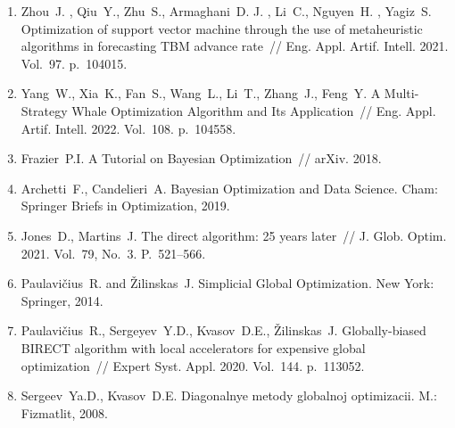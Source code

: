 \documentclass[a4paper,12pt,russian]{article}
\begin{document}
\begin{enumerate}
\item \label{rfa:enlit:Zhou2021}
Zhou~J. , Qiu~Y.,  Zhu~S., Armaghani~D. J. , Li~C., Nguyen~H. , Yagiz~S. Optimization of support vector machine through the use of metaheuristic algorithms in forecasting {TBM} advance rate~// Eng. Appl. Artif. Intell. 2021. Vol.~97. p.~104015.  %

\item \label{rfa:enlit:Yang2022}
Yang~W., Xia~K., Fan~S., Wang~L., Li~T., Zhang~J., Feng~Y. A Multi-Strategy Whale Optimization Algorithm and Its Application~// Eng. Appl. Artif. Intell. 2022. Vol.~108. p.~104558. %

\item \label{rfa:enlit:Frazier2018}
Frazier~P.I. A Tutorial on Bayesian Optimization~// arXiv. 2018. %

\item \label{rfa:enlit:Archetti2019}
Archetti~F., Candelieri~A. Bayesian Optimization and Data Science. Cham: Springer Briefs in Optimization, 2019. %

\item \label{rfa:enlit:Jones2021}
Jones~D., Martins~J. The direct algorithm: 25 years later~// J. Glob. Optim. 2021. Vol.~79, No.~3. P.~521--566. %

\item \label{rfa:enlit:PaulaviciusZilinskas2014}
Paulavi{\v c}ius~R. and {\v Z}ilinskas~J. Simplicial Global Optimization. New York: Springer, 2014. %

\item \label{rfa:enlit:Birect2020}
Paulavi{\v c}ius~R., Sergeyev~Y.D., Kvasov~D.E., {\v Z}ilinskas~J. Globally-biased {BIRECT} al\-go\-rithm with local accelerators for expensive global optimization~// 
Expert Syst. Appl. 2020. Vol.~144. p.~113052. %

\item \label{rfa:enlit:Sergeyev2017}
Sergeev~Ya.D., Kvasov~D.E. Diagonalnye metody globalnoj optimizacii.  M.: Fizmatlit, 2008. 


\end{enumerate}
\end{document}
